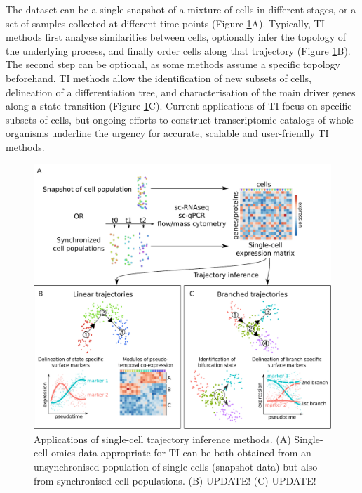 The dataset can be a single snapshot of a mixture of cells in different stages, or a set of samples collected at different time points (Figure \ref{fig:trajectory_inference}A). Typically, TI methods first analyse similarities between cells, optionally infer the topology of the underlying process, and finally order cells along that trajectory (Figure \ref{fig:trajectory_inference}B). The second step can be optional, as some methods assume a specific topology beforehand.
TI methods allow the identification of new subsets of cells, delineation of a differentiation tree, and characterisation of the main driver genes along a state transition (Figure \ref{fig:trajectory_inference}C). Current applications of TI focus on specific subsets of cells, but ongoing efforts to construct transcriptomic catalogs of whole organisms \cite{regev_humancellatlas_2017,han_mappingmousecell_2018,schaum_singlecelltranscriptomics20_2018} underline the urgency for accurate, scalable \cite{aibar_scenicsinglecellregulatory_2017,angerer_singlecellsmake_2017} and user-friendly TI methods.

\begin{figure}[htb!]
	\centering\includegraphics[width=\Largefigure]{fig/trajectory_inference_slim} %
	\caption{
		Applications of single-cell trajectory inference methods. (A) Single-cell omics data appropriate for TI can be both obtained from an unsynchronised population of single cells (snapshot data) but also from synchronised cell populations. (B) UPDATE! (C) UPDATE!
	}
	\label{fig:trajectory_inference}
\end{figure}


